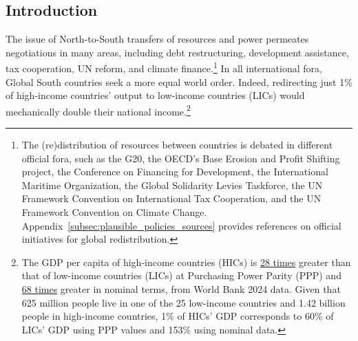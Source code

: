 \documentclass[12pt,english]{article}
\begin{document}
\begin{bibunit}

\section{Introduction}\label{sec:intro}%

The issue of North-to-South transfers of resources and power 
permeates negotiations in many areas, including debt restructuring, development assistance, tax cooperation, UN reform, and climate finance.\footnote{The (re)distribution of resources between countries is debated in different official fora, such as the G20, the OECD's Base Erosion and Profit Shifting project, the Conference on Financing for Development, the International Maritime Organization, the Global Solidarity Levies Taskforce, the UN Framework Convention on International Tax Cooperation, and the UN Framework Convention on Climate Change. Appendix~\ref{subsec:plausible_policies_sources} provides references on official initiatives for global redistribution.} 
In all international fora, Global South countries seek %
a more equal world order. Indeed, redirecting just 1\% of high-income countries' output to low-income countries (LICs) would mechanically double their national income.\footnote{The GDP per capita of high-income countries (HICs) is \href{https://data.worldbank.org/indicator/NY.GDP.PCAP.PP.CD?contextual=default&end=2024&locations=EU-ZG-XD-XM-1W-IN-US-CD-BI-LU-CN&start=2024&view=bar}{28 times} greater than that of low-income countries (LICs) at Purchasing Power Parity (PPP) and \href{https://data.worldbank.org/indicator/NY.GDP.PCAP.CD?end=2024&locations=EU-ZG-XD-XM-1W-IN-US-CD-BI-LU-CN&start=2024&view=bar}{68 times} greater in nominal terms, from World Bank 2024 data. Given that 625 million people live in one of the 25 low-income countries %
and 1.42 billion people in high-income countries, %
1\% of HICs' GDP corresponds to 60\% of LICs' GDP using PPP values and 153\% using nominal data.
} %


\end{bibunit}
\end{document}
